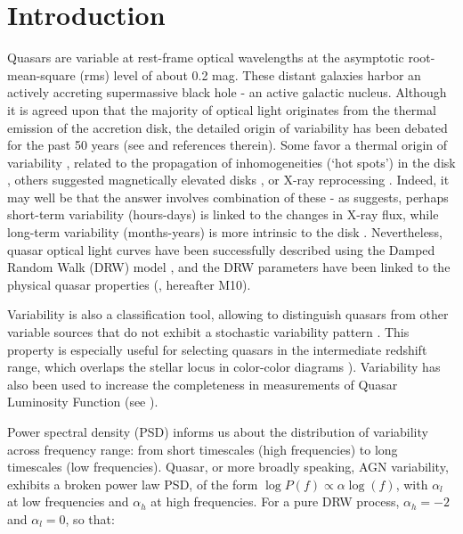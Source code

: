 \documentclass[twocolumn]{aastex62}
\begin{document}
\section{Introduction}

Quasars are variable at rest-frame optical wavelengths at the asymptotic root-mean-square (rms) level of about 0.2 mag. These distant galaxies harbor an actively accreting supermassive black hole - an active galactic nucleus. Although it is agreed upon that the majority of optical light originates from the thermal emission of the accretion disk, the detailed origin of variability has been debated for the past 50 years (see \citealt{sun2018} and references therein). Some favor a thermal origin of variability \citep{kelly2013}, related to the propagation of inhomogeneities (`hot spots') in the disk \citep{dexter2011, cai2016}, others suggested magnetically elevated disks \citep{dexter2019}, or X-ray reprocessing  \citep{kubota2018}.  Indeed, it may well be that the answer involves combination of these -  as \cite{sanchez2018} suggests, perhaps short-term variability (hours-days) is linked to the changes in X-ray flux, while long-term variability (months-years) is more intrinsic to the disk \citep{edelson2015,lira2015}. Nevertheless, quasar optical light curves have been successfully described using the Damped Random Walk (DRW) model \citep{kelly2009, macleod2010, kozlowski2010, zu2011, kasliwal2015a}, and the DRW parameters have been linked to the physical quasar properties (\citealt{macleod2010}, hereafter M10). 

Variability is also a classification tool, allowing to distinguish quasars from other variable sources that do not exhibit a stochastic variability pattern \citep{macleod2011}. This property is especially useful for selecting quasars in the intermediate redshift range, which overlaps the stellar locus in color-color diagrams \citep{sesar2007, yang2017}). Variability has also been used to increase the completeness in measurements of Quasar Luminosity Function (see \citealt{ ross2013, palanque2013, alsayyad2016, mcgreer2013, mcgreer2018}). 

Power spectral density (PSD) informs us about the distribution of variability across frequency range: from short timescales (high frequencies) to long timescales (low frequencies). Quasar, or more broadly speaking, AGN variability, exhibits a broken power law PSD, of the form 
$\log{P(f)} \propto \alpha \log{(f)}$, with $\alpha_l$ at low frequencies and $\alpha_h$ at high frequencies. For a pure DRW process,  $\alpha_{h}{=}-2$ and $\alpha_{l}{=}0$, so that:
\end{document}
